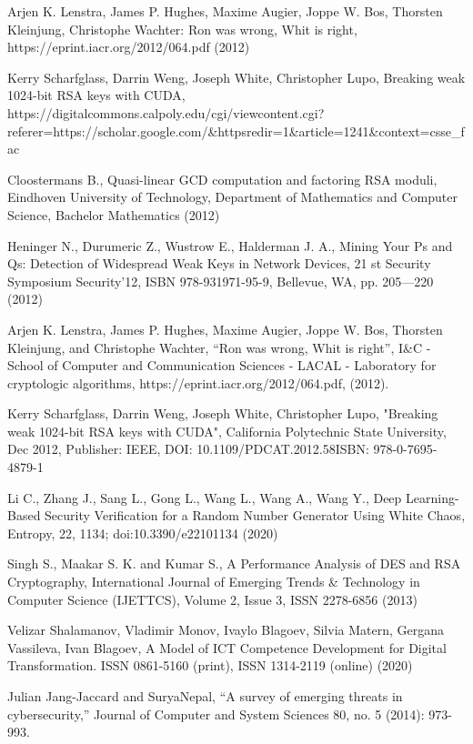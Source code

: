 \begin{thebibliography}{99.}

 Arjen K. Lenstra, James P. Hughes, Maxime Augier, Joppe W. Bos, Thorsten Kleinjung, Christophe Wachter: Ron was wrong, Whit is right, https://eprint.iacr.org/2012/064.pdf (2012)

 Kerry Scharfglass, Darrin Weng, Joseph White, Christopher Lupo, Breaking weak 1024-bit RSA keys with CUDA, https://digitalcommons.calpoly.edu/cgi/viewcontent.cgi? referer=https://scholar.google.com/\&httpsredir=1\&article=1241\&context=csse\_fac

 Cloostermans B., Quasi-linear GCD computation and factoring RSA moduli, Eindhoven University of Technology, Department of Mathematics and Computer Science, Bachelor Mathematics (2012)

 Heninger N., Durumeric Z., Wustrow E., Halderman J. A., Mining Your Ps and Qs: Detection of Widespread Weak Keys in Network Devices, 21 st Security Symposium Security’12, ISBN 978-931971-95-9, Bellevue, WA, pp. 205—220 (2012)

 Arjen K. Lenstra, James P. Hughes, Maxime Augier, Joppe W. Bos, Thorsten Kleinjung, and Christophe Wachter, “Ron was wrong, Whit is right”, I\&C - School of Computer and Communication Sciences - LACAL - Laboratory for cryptologic algorithms, https://eprint.iacr.org/2012/064.pdf, (2012).

 Kerry Scharfglass, Darrin Weng, Joseph White, Christopher Lupo, "Breaking weak 1024-bit RSA keys with CUDA", California Polytechnic State University, Dec 2012, Publisher: IEEE, DOI: 10.1109/PDCAT.2012.58ISBN: 978-0-7695-4879-1

 Li C., Zhang J., Sang L., Gong L., Wang L., Wang A., Wang Y., Deep Learning- Based Security Verification for a Random Number Generator Using White Chaos, Entropy, 22, 1134; doi:10.3390/e22101134 (2020)

 Singh S., Maakar S. K. and Kumar S., A Performance Analysis of DES and RSA Cryptography, International Journal of Emerging Trends \& Technology in Computer Science (IJETTCS), Volume 2, Issue 3, ISSN 2278-6856 (2013)

 Velizar Shalamanov, Vladimir Monov, Ivaylo Blagoev, Silvia Matern, Gergana Vassileva, Ivan Blagoev, A Model of ICT Competence Development for Digital Transformation. ISSN 0861-5160 (print), ISSN 1314-2119 (online) (2020)

 Julian Jang-Jaccard and SuryaNepal, “A survey of emerging threats in cybersecurity,” Journal of Computer and System Sciences 80, no. 5 (2014): 973-993. 


\end{thebibliography}
